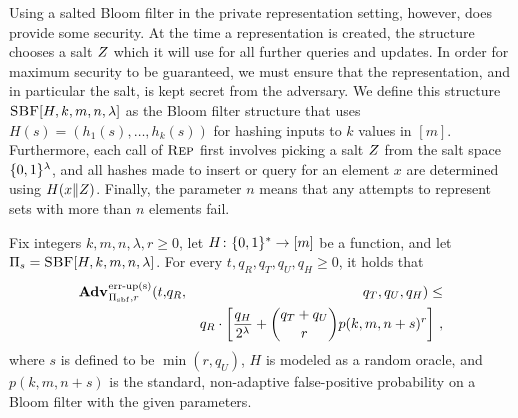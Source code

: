 Using a salted Bloom filter in the private representation setting, however, does provide some security. At the time a representation is created, the structure chooses a salt $Z$ which it will use for all further queries and updates. In order for maximum security to be guaranteed, we must ensure that the representation, and in particular the salt, is kept secret from the adversary. We define this structure $\textsc{SBF}[H,k,m,n,\lambda]$ as the Bloom filter structure that uses $H(s) = (h_1(s),\ldots,h_k(s))$ for hashing inputs to $k$ values in $[m]$. Furthermore, each call of $\textsc{Rep}$ first involves picking a salt $Z$ from the salt space $\{0,1\}^\lambda$, and all hashes made to insert or query for an element $x$ are determined using $H(x \Vert Z)$. Finally, the parameter $n$ means that any attempts to represent sets with more than $n$ elements fail.
\begin{theorem}\label{thm:bf-priv-salt-bound}
Fix integers $k, m, n, \lambda, r\geq 0$, let $H \colon \{0,1\}^* \to [m]$ be a function, and let $\mathrm{\Pi}_s = \textsc{SBF}[H,k,m,n,\lambda]$.
  For every $t, q_R, q_T, q_U, q_H \geq 0$, it holds that
  \begin{eqnarray*}
    \Adv{\erreps}_{\struct_\saltybloom,r}(t,&q_R,& q_T, q_U, q_H) \leq \\ && q_R \cdot
     \left[
      \frac{q_H}{2^\lambda} +
      {\dbinom{q_T+q_U}{r}} p(k, m, n+s)^r
    \right] \,,
\end{eqnarray*}
where $s$ is defined to be $\min(r,q_U)$, $H$ is modeled as a random oracle, and $p(k, m, n+s)$ is the standard, non-adaptive false-positive probability on a Bloom filter with the given parameters.
\end{theorem}

